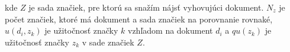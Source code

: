 kde \(Z\) je sada značiek, pre ktorú sa snažím nájsť vyhovujúci dokument. \(N_z\) je počet značiek,
ktoré má dokument a sada značiek na porovnanie rovnaké, \(u(d_i, z_k)\) je užitočnosť značky
\(k\) vzhľadom na dokument \(d_i\) a \(qu(z_k)\) je užitočnosť značky \(z_k\) v sade značiek
\(Z\).

%
%
%
%

